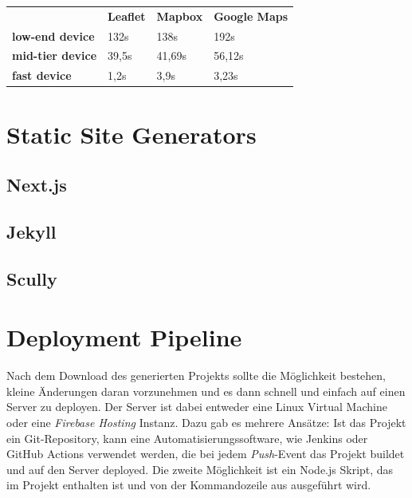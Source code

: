\begin{table}[hbt!]
    \centering
    \begin{tabular}{llll}
        & \textbf{Leaflet} & \textbf{Mapbox} & \textbf{Google Maps} \\
        \textbf{low-end device}  & 132s             & 138s            & 192s                 \\
        \textbf{mid-tier device} & 39,5s            & 41,69s          & 56,12s               \\
        \textbf{fast device}     & 1,2s             & 3,9s            & 3,23s
    \end{tabular}\label{tab:map-framework-table}
\end{table}

\cleardoublepage

\section{Static Site Generators}

\subsection{Next.js}

\subsection{Jekyll}

\subsection{Scully}


\section{Deployment Pipeline}
Nach dem Download des generierten Projekts sollte die Möglichkeit bestehen,
kleine Änderungen daran vorzunehmen und es dann schnell und einfach auf einen
Server zu deployen. Der Server ist dabei entweder eine Linux Virtual Machine
oder eine \textit{Firebase Hosting} Instanz.
Dazu gab es mehrere Ansätze: Ist das Projekt ein Git-Repository, kann eine
Automatisierungssoftware, wie Jenkins oder GitHub Actions verwendet werden,
die bei jedem \textit{Push}-Event das Projekt buildet und auf den Server
deployed. Die zweite Möglichkeit ist ein Node.js Skript, das im Projekt
enthalten ist und von der Kommandozeile aus ausgeführt wird.

